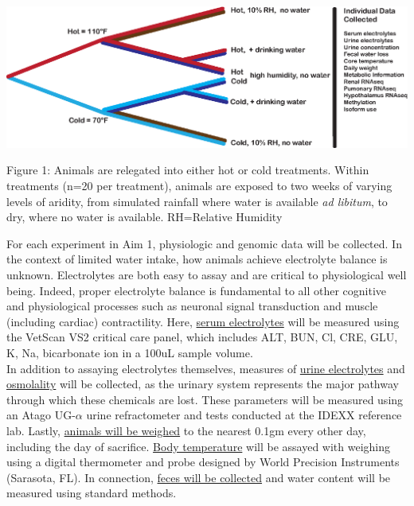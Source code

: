 \documentclass[12pt]{article}
\begin{document}
\vspace{2mm}

\begin{mdframed}
 \begin{center}
  \includegraphics[width=1\textwidth]{exp_design_fig.eps}
 \end{center} 

\noindent \small{Figure 1: Animals are relegated into either hot or cold treatments. Within treatments (n=20 per treatment), animals are exposed to two weeks of varying levels of aridity, from simulated rainfall where water is available \textit{ad libitum}, to dry, where no water is available. RH=Relative Humidity}

\end{mdframed}

\vspace{5mm}


For each experiment in Aim 1, physiologic and genomic data will be collected. In the context of limited water intake, how animals achieve electrolyte balance is unknown. Electrolytes are both easy to assay and are critical to physiological well being. Indeed, proper electrolyte balance is fundamental to all other cognitive and physiological processes such as neuronal signal transduction and muscle (including cardiac) contractility. Here, \ul{serum electrolytes} will be measured using the VetScan VS2 critical care panel, which includes ALT, BUN, Cl, CRE, GLU, K, Na, bicarbonate ion in a 100uL sample volume. \\

In addition to assaying electrolytes themselves, measures of \ul{urine electrolytes} and \ul{osmolality} will be collected, as the urinary system represents the major pathway through which these chemicals are lost. These parameters will be measured using an Atago UG-$\alpha$ urine refractometer and tests conducted at the IDEXX reference lab. Lastly, \ul{animals will be weighed} to the nearest 0.1gm every other day, including the day of sacrifice. \ul{Body temperature} will be assayed with weighing using a digital thermometer and probe designed by World Precision Instruments (Sarasota, FL). In connection, \ul{feces will be collected} and water content will be measured using standard methods. \\
\end{document}
